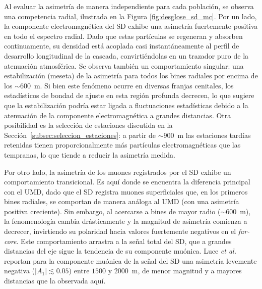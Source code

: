 Al evaluar la asimetría de manera independiente para cada población, se observa una competencia radial, ilustrada en la Figura \ref{fig:desglose_sd_mc}. Por un lado, la componente electromagnética del SD exhibe una asimetría fuertemente positiva en todo el espectro radial. Dado que estas partículas se regeneran y absorben continuamente, su densidad está acoplada casi instantáneamente al perfil de desarrollo longitudinal de la cascada, convirtiéndolas en un trazador puro de la atenuación atmosférica. Se observa también un comportamiento singular: una estabilización (meseta) de la asimetría para todos los bines radiales por encima de los $\sim 600$~m. Si bien este fenómeno ocurre en diversas franjas cenitales, los estadísticos de bondad de ajuste en esta región profunda decrecen, lo que sugiere que la estabilización podría estar ligada a fluctuaciones estadísticas debido a la atenuación de la componente electromagnética a grandes distancias. Otra posibilidad es la selección de estaciones discutida en la Sección~\ref{subsec:seleccion_estaciones}: a partir de $\sim 900$~m las estaciones tardías retenidas tienen proporcionalmente más partículas electromagnéticas que las tempranas, lo que tiende a reducir la asimetría medida.

Por otro lado, la asimetría de los muones registrados por el SD exhibe un comportamiento transicional. Es aquí donde se encuentra la diferencia principal con el UMD, dado que el SD registra muones superficiales que, en los primeros bines radiales, se comportan de manera análoga al UMD (con una asimetría positiva creciente). Sin embargo, al acercarse a bines de mayor radio ($\sim 600$~m), la fenomenología cambia drásticamente y la magnitud de asimetría comienza a decrecer, invirtiendo su polaridad hacia valores fuertemente negativos en el \textit{far-core}. Este comportamiento arrastra a la señal total del SD, que a grandes distancias del eje sigue la tendencia de su componente muónica. Luce \textit{et al.} \cite{Luce_ICRC2021} reportan para la componente muónica de la señal del SD una asimetría levemente negativa ($|A_1| \lesssim 0.05$) entre $1500$ y $2000$~m, de menor magnitud y a mayores distancias que la observada aquí.

